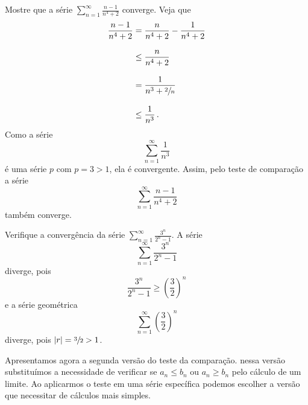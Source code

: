 
\begin{example}
  Mostre que a série \(\sum_{n=1}^\infty \frac{n-1}{n^4+2}\) converge.
  \solution
  Veja que
  \begin{align*}
    \frac{n-1}{n^4+2} & =    \frac{n}{n^4+2} - \frac{1}{n^4+2} \\[3mm]
                      & \leq \frac{n}{n^4+2}                   \\[3mm]
                      & =    \frac{1}{n^3 + \sfrac{2}{n}}      \\[3mm]
                      & \leq \frac{1}{n^3}                     \,.
  \end{align*}
  Como a série
  \[
    \sum_{n=1}^\infty \frac{1}{n^3}
  \]
  é uma série $p$ com $p=3>1$, ela é convergente.
  Assim, pelo teste de comparação a série
  \[
    \sum_{n=1}^\infty \frac{n-1}{n^4+2}
  \]
  também converge.
\end{example}

\begin{example}
  Verifique a convergência da série
  \(
    \sum_{n=1}^\infty\frac{3^n}{2^n-1}
  \).
  \solution
  A série
  \[
    \sum_{n=1}^\infty\frac{3^n}{2^n-1}
  \]
  diverge, pois
  \[
    \frac{3^n}{2^n-1}\geq \left(\frac{3}{2}\right)^n
  \]
  e a série geométrica
  \[
    \sum_{n=1}^\infty\left(\frac{3}{2}\right)^n
  \]
  diverge, pois
  \(
    \abs{r}=\sfrac{3}{2}>1
  \).
\end{example}

Apresentamos agora a segunda versão do teste da comparação. nessa versão substituímos
a necessidade de verificar se $a_n\leq b_n$ ou $a_n\geq b_n$ pelo cálculo de um
limite. Ao aplicarmos o teste em uma série específica podemos escolher a versão
que necessitar de cálculos mais simples.

